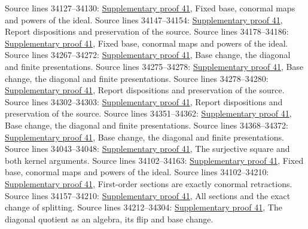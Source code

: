 \begin{AlgebraSourceRoutes}
 Source lines 34127--34130: \hyperlink{algebra_differentials_notes_20260928}{Supplementary proof 41}, Fixed base, conormal maps and powers of the ideal.
 Source lines 34147--34154: \hyperlink{algebra_differentials_notes_20260928}{Supplementary proof 41}, Report dispositions and preservation of the source.
 Source lines 34178--34186: \hyperlink{algebra_differentials_notes_20260928}{Supplementary proof 41}, Fixed base, conormal maps and powers of the ideal.
 Source lines 34267--34272: \hyperlink{algebra_differentials_notes_20260928}{Supplementary proof 41}, Base change, the diagonal and finite presentations.
 Source lines 34275--34278: \hyperlink{algebra_differentials_notes_20260928}{Supplementary proof 41}, Base change, the diagonal and finite presentations.
 Source lines 34278--34280: \hyperlink{algebra_differentials_notes_20260928}{Supplementary proof 41}, Report dispositions and preservation of the source.
 Source lines 34302--34303: \hyperlink{algebra_differentials_notes_20260928}{Supplementary proof 41}, Report dispositions and preservation of the source.
 Source lines 34351--34362: \hyperlink{algebra_differentials_notes_20260928}{Supplementary proof 41}, Base change, the diagonal and finite presentations.
 Source lines 34368--34372: \hyperlink{algebra_differentials_notes_20260928}{Supplementary proof 41}, Base change, the diagonal and finite presentations.
 Source lines 34043--34048: \hyperlink{algebra_differentials_notes_20260928}{Supplementary proof 41}, The surjective square and both kernel arguments.
 Source lines 34102--34163: \hyperlink{algebra_differentials_notes_20260928}{Supplementary proof 41}, Fixed base, conormal maps and powers of the ideal.
 Source lines 34102--34210: \hyperlink{algebra_differentials_notes_20260928}{Supplementary proof 41}, First-order sections are exactly conormal retractions.
 Source lines 34157--34210: \hyperlink{algebra_differentials_notes_20260928}{Supplementary proof 41}, All sections and the exact change of splitting.
 Source lines 34212--34304: \hyperlink{algebra_differentials_notes_20260928}{Supplementary proof 41}, The diagonal quotient as an algebra, its flip and base change.
\end{AlgebraSourceRoutes}

